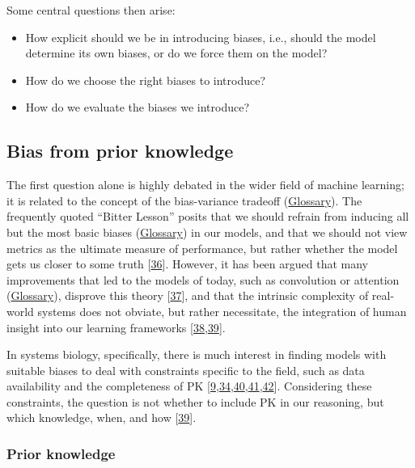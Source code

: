 Some central questions then arise:

\begin{itemize}
\item
  How explicit should we be in introducing biases, i.e., should the model determine its own biases, or do we force them on the model?
\item
  How do we choose the right biases to introduce?
\item
  How do we evaluate the biases we introduce?
\end{itemize}

\hypertarget{bias-from-prior-knowledge}{%
\subsection{Bias from prior knowledge}\label{bias-from-prior-knowledge}}

The first question alone is highly debated in the wider field of machine learning; it is related to the concept of the bias-variance tradeoff (\protect\hyperlink{bias-variance-tradeoff}{Glossary}).
The frequently quoted ``Bitter Lesson'' posits that we should refrain from inducing all but the most basic biases (\protect\hyperlink{bias-machine-learning}{Glossary}) in our models, and that we should not view metrics as the ultimate measure of performance, but rather whether the model gets us closer to some truth {[}\protect\hyperlink{ref-ydpntqD3}{36}{]}.
However, it has been argued that many improvements that led to the models of today, such as convolution or attention (\protect\hyperlink{attention-deep-learning}{Glossary}), disprove this theory {[}\protect\hyperlink{ref-rh7nCPVE}{37}{]}, and that the intrinsic complexity of real-world systems does not obviate, but rather necessitate, the integration of human insight into our learning frameworks {[}\protect\hyperlink{ref-eT8vyMzx}{38},\protect\hyperlink{ref-AT0GCO31}{39}{]}.

In systems biology, specifically, there is much interest in finding models with suitable biases to deal with constraints specific to the field, such as data availability and the completeness of PK {[}\protect\hyperlink{ref-17scpieH5}{9},\protect\hyperlink{ref-11wELIlTc}{34},\protect\hyperlink{ref-URCTSFCA}{40},\protect\hyperlink{ref-T7D6XA6s}{41},\protect\hyperlink{ref-vm2M7mI5}{42}{]}.
Considering these constraints, the question is not whether to include PK in our reasoning, but which knowledge, when, and how {[}\protect\hyperlink{ref-AT0GCO31}{39}{]}.

\hypertarget{prior-knowledge}{%
\subsubsection{Prior knowledge}\label{prior-knowledge}}

